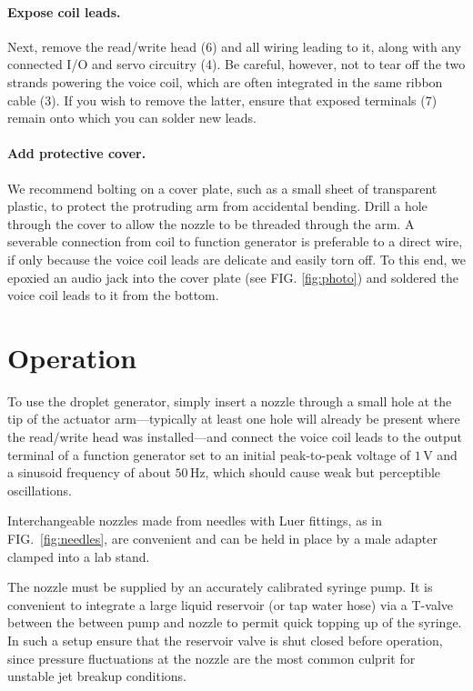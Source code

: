 \documentclass[11.5pt,oneside]{book}
\begin{document}
\paragraph{Expose coil leads.} Next, remove the read/write head (6) and all
wiring leading to it, along with any connected I/O and servo circuitry (4). Be
careful, however, not to tear off the two strands powering the voice coil, which
are often integrated in the same ribbon cable (3). If you wish to remove the
latter, ensure that exposed terminals (7) remain onto which you can solder new leads.

\paragraph{Add protective cover.} We recommend bolting on a cover plate, such
as a small sheet of transparent plastic, to protect the protruding arm from
accidental bending. Drill a hole through the cover to allow the nozzle to be
threaded through the arm. A severable
connection from coil to function generator is preferable to a direct wire, if
only because the voice coil leads are delicate and easily torn off. To this end, we epoxied
an audio jack into the cover plate (see FIG. \ref{fig:photo}) and soldered the voice coil leads to it from the
bottom.

\section{Operation}
To use the droplet generator, simply insert a nozzle through a small hole at the
tip of the actuator arm---typically at least one hole will already be present
where the read/write head was installed---and connect the voice coil leads to the output terminal of a function
generator set to an initial peak-to-peak voltage of $1\,$V and a sinusoid frequency of
about $50\,$Hz, which should cause weak but perceptible oscillations.

Interchangeable nozzles made from needles with Luer fittings, as in FIG.~\ref{fig:needles}, are
convenient and can be held in place by a male adapter clamped into a lab stand.

The nozzle must be supplied by an accurately calibrated syringe pump. It is
convenient to integrate a large liquid reservoir (or tap water hose) via a
T-valve between the between pump and nozzle to permit quick topping up of the
syringe. In such a setup ensure that the reservoir valve is shut closed before operation,
since pressure fluctuations at the nozzle are the most common culprit for
unstable jet breakup conditions.
\end{document}
